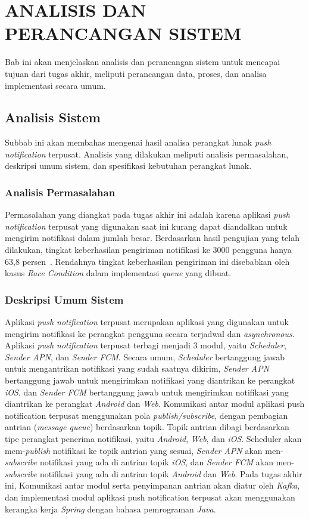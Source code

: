 \chapter{ANALISIS DAN PERANCANGAN SISTEM}
Bab ini akan menjelaskan analisis dan perancangan sistem untuk mencapai tujuan dari tugas akhir, meliputi perancangan data, proses, dan analisa implementasi secara umum.

\section{Analisis Sistem}
Subbab ini akan membahas mengenai hasil analisa perangkat lunak \textit{push notification} terpusat.
Analisis yang dilakukan meliputi analisis permasalahan, deskripsi umum sistem, dan spesifikasi kebutuhan perangkat lunak.

\subsection{Analisis Permasalahan}
Permasalahan yang diangkat pada tugas akhir ini adalah karena aplikasi \textit{push notification} terpusat yang digunakan saat ini kurang dapat diandalkan untuk mengirim notifikasi dalam jumlah besar.
Berdasarkan hasil pengujian yang telah dilakukan, tingkat keberhasilan pengiriman notifikasi ke 3000 pengguna hanya 63,8 persen~\cite{application-thesis}.
Rendahnya tingkat keberhasilan pengiriman ini disebabkan oleh kasus \textit{Race Condition} dalam implementasi \textit{queue} yang dibuat.

\subsection{Deskripsi Umum Sistem}
Aplikasi \textit{push notification} terpusat merupakan aplikasi yang digunakan untuk mengirim notifikasi ke perangkat pengguna secara terjadwal dan \textit{asynchronous}.
Aplikasi \textit{push notification} terpusat terbagi menjadi 3 modul, yaitu \textit{Scheduler}, \textit{Sender APN}, dan \textit{Sender FCM}.
Secara umum, \textit{Scheduler} bertanggung jawab untuk mengantrikan notifikasi yang sudah saatnya dikirim, \textit{Sender APN} bertanggung jawab untuk mengirimkan notifikasi yang diantrikan ke perangkat \textit{iOS}, dan \textit{Sender FCM} bertanggung jawab untuk mengirimkan notifikasi yang diantrikan ke perangkat \textit{Android} dan \textit{Web}.
Komunikasi antar modul aplikasi push notification terpusat menggunakan pola \textit{publish/subscribe}, dengan pembagian antrian (\textit{message queue}) berdasarkan topik.
Topik antrian dibagi berdasarkan tipe perangkat penerima notifikasi, yaitu \textit{Android}, \textit{Web}, dan \textit{iOS}.
Scheduler akan mem-\textit{publish} notifikasi ke topik antrian yang sesuai, \textit{Sender APN} akan men-\textit{subscribe} notifikasi yang ada di antrian topik \textit{iOS}, dan \textit{Sender FCM} akan men-\textit{subscribe} notifikasi yang ada di antrian topik \textit{Android} dan \textit{Web}.
Pada tugas akhir ini, Komunikasi antar modul serta penyimpanan antrian akan diatur oleh \textit{Kafka}, dan implementasi modul aplikasi push notification terpusat akan menggunakan kerangka kerja \textit{Spring} dengan bahasa pemrograman \textit{Java}.

